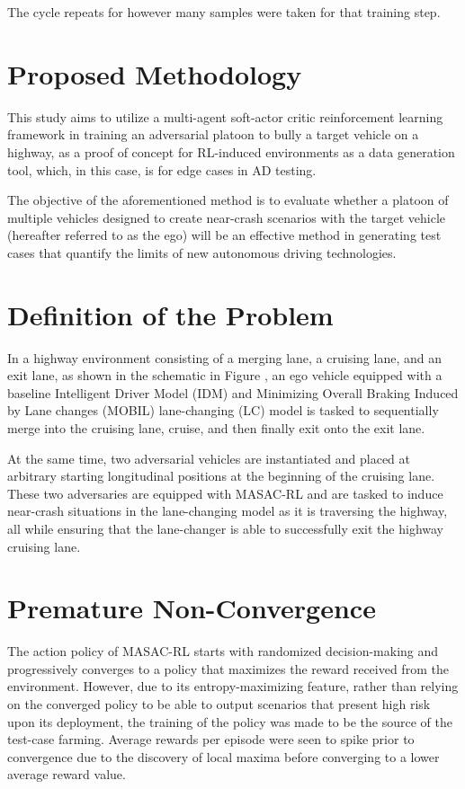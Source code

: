\documentclass[12pt, a4paper]{report}
\begin{document}
The cycle repeats for however many samples were taken for that training step.

\section{Proposed Methodology}

This study aims to utilize a multi-agent soft-actor critic reinforcement learning framework in training an adversarial platoon to bully a target vehicle on a highway, as a proof of concept for RL-induced environments as a data generation tool, which, in this case, is for edge cases in AD testing.

The objective of the aforementioned method is to evaluate whether a platoon of multiple vehicles designed to create near-crash scenarios with the target vehicle (hereafter referred to as the ego) will be an effective method in generating test cases that quantify the limits of new autonomous driving technologies.

\section{Definition of the Problem}

In a highway environment consisting of a merging lane, a cruising lane, and an exit lane, as shown in the schematic in Figure {}, an ego vehicle equipped with a baseline Intelligent Driver Model (IDM) and Minimizing Overall Braking Induced by Lane changes (MOBIL) lane-changing (LC) model is tasked to sequentially merge into the cruising lane, cruise, and then finally exit onto the exit lane.

At the same time, two adversarial vehicles are instantiated and placed at arbitrary starting longitudinal positions at the beginning of the cruising lane. These two adversaries are equipped with MASAC-RL and are tasked to induce near-crash situations in the lane-changing model as it is traversing the highway, all while ensuring that the lane-changer is able to successfully exit the highway cruising lane.

\section{Premature Non-Convergence}

The action policy of MASAC-RL starts with randomized decision-making and progressively converges to a policy that maximizes the reward received from the environment. However, due to its entropy-maximizing feature, rather than relying on the converged policy to be able to output scenarios that present high risk upon its deployment, the training of the policy was made to be the source of the test-case farming. Average rewards per episode were seen to spike prior to convergence due to the discovery of local maxima before converging to a lower average reward value.
\end{document}
